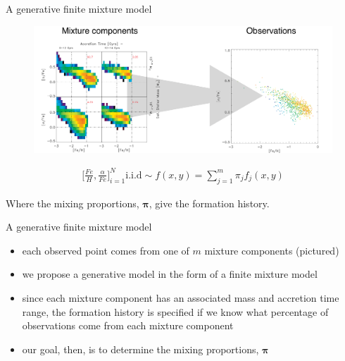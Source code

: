 \documentclass{beamer}
\newcommand{\eqn}[1]{\begin{align*}
#1
\end{align*}}
\newcommand{\vect}[1]{\boldsymbol{\mathbf{#1}}}
\newcommand{\afe}{\frac{\alpha}{Fe}}
\newcommand{\feh}{\frac{Fe}{H}}
\newcommand{\vp}{\vect{\pi}}
\begin{document}
\begin{frame}{A generative finite mixture model}
	
	
		
	\begin{figure}
			\begin{center}
				\includegraphics[scale=0.31]{denstoobs.pdf}
			\end{center}
	\end{figure}
	
	\vspace{-8mm}
	
	\eqn{
		\Bigg[\feh,\afe\Bigg]_{i=1}^{N} \text{i.i.d} \sim f(x,y) = \sum^m_{j=1} \pi_j f_j(x,y)
	}
	
	\begin{center}
		Where the mixing proportions, $\vp$, give the formation history.
	\end{center}
	
\end{frame}
\begin{frame}[shrink]{A generative finite mixture model}
	
	\begin{itemize}
		
		\item each observed point comes from one of $m$ mixture components (pictured)
		\item we propose a generative model in the form of a finite mixture model
		\item since each mixture component has an associated mass and accretion time range, the formation history is specified if we know what percentage of observations come from each mixture component
		\item our goal, then, is to determine the mixing proportions, $\vp$
	\end{itemize}
	
\end{frame}
\end{document}
